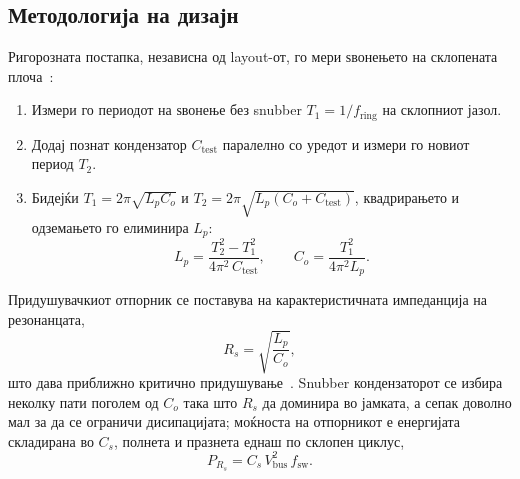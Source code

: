 \documentclass[journal,onecolumn,11pt]{IEEEtran}
\newcommand{\Vdcbus}{V_{\mathrm{bus}}}
\newcommand{\Fswsw}{f_{\mathrm{sw}}}
\begin{document}
\subsection{Методологија на дизајн}
Ригорозната постапка, независна од layout-от, го мери ѕвонењето на склопената плоча~\cite{severns,
digikey_snubber}:
\begin{enumerate}[leftmargin=1.4em]
\item Измери го периодот на ѕвонење без snubber \(T_1=1/f_{\mathrm{ring}}\) на склопниот јазол.
\item Додај познат кондензатор \(C_{\mathrm{test}}\) паралелно со уредот и измери го новиот период \(T_2\).
\item Бидејќи \(T_1=2\pi\sqrt{L_pC_o}\) и \(T_2=2\pi\sqrt{L_p(C_o+C_{\mathrm{test}})}\), квадрирањето и
одземањето го елиминира \(L_p\):
\begin{equation}
L_p=\frac{T_2^{2}-T_1^{2}}{4\pi^{2}\,C_{\mathrm{test}}},\qquad
C_o=\frac{T_1^{2}}{4\pi^{2}L_p}.
\label{eq:extract}
\end{equation}
\end{enumerate}
Придушувачкиот отпорник се поставува на карактеристичната импеданција на резонанцата,
\begin{equation}
R_s=\sqrt{\frac{L_p}{C_o}},
\label{eq:rs}
\end{equation}
што дава приближно критично придушување~\cite{digikey_snubber}. Snubber кондензаторот се избира неколку
пати поголем од \(C_o\) така што \(R_s\) да доминира во јамката, а сепак доволно мал за да се ограничи
дисипацијата; моќноста на отпорникот е енергијата складирана во \(C_s\), полнета и празнета еднаш по
склопен циклус,
\begin{equation}
P_{R_s}=C_s\,\Vdcbus^{2}\,\Fswsw .
\label{eq:psnub}
\end{equation}
\end{document}

